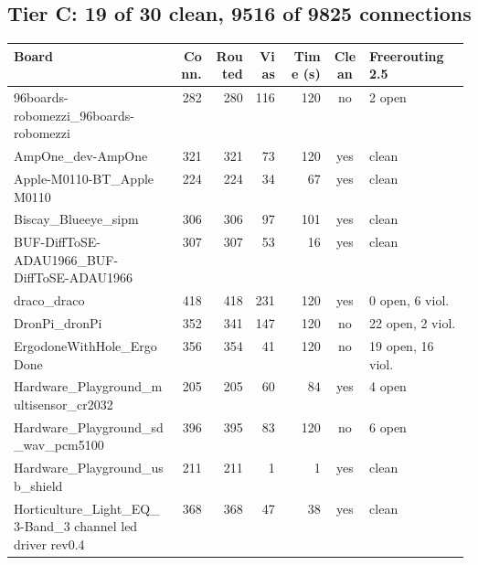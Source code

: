\subsection*{Tier C: 19 of 30 clean, 9516 of 9825 connections}
\begin{longtable}{@{}p{0.36\linewidth}rrrrcp{0.22\linewidth}@{}}
\toprule Board & Conn. & Routed & Vias & Time (s) & Clean & Freerouting 2.5 \\ \midrule \endhead
96boards-\allowbreak{}robomezzi\_\allowbreak{}96boards-\allowbreak{}robomezzi & 282 & 280 & 116 & 120 & \textcolor{frorange}{no} & {\footnotesize 2 open} \\
AmpOne\_\allowbreak{}dev-\allowbreak{}AmpOne & 321 & 321 & 73 & 120 & \textcolor{fraqua}{yes} & {\footnotesize clean} \\
Apple-\allowbreak{}M0110-\allowbreak{}BT\_\allowbreak{}Apple M0110 & 224 & 224 & 34 & 67 & \textcolor{fraqua}{yes} & {\footnotesize clean} \\
Biscay\_\allowbreak{}Blueeye\_\allowbreak{}sipm & 306 & 306 & 97 & 101 & \textcolor{fraqua}{yes} & {\footnotesize clean} \\
BUF-\allowbreak{}DiffToSE-\allowbreak{}ADAU1966\_\allowbreak{}BUF-\allowbreak{}DiffToSE-\allowbreak{}ADAU1966 & 307 & 307 & 53 & 16 & \textcolor{fraqua}{yes} & {\footnotesize clean} \\
draco\_\allowbreak{}draco & 418 & 418 & 231 & 120 & \textcolor{fraqua}{yes} & {\footnotesize 0 open, 6 viol.} \\
DronPi\_\allowbreak{}dronPi & 352 & 341 & 147 & 120 & \textcolor{frorange}{no} & {\footnotesize 22 open, 2 viol.} \\
ErgodoneWithHole\_\allowbreak{}ErgoDone & 356 & 354 & 41 & 120 & \textcolor{frorange}{no} & {\footnotesize 19 open, 16 viol.} \\
Hardware\_\allowbreak{}Playground\_\allowbreak{}multisensor\_\allowbreak{}cr2032 & 205 & 205 & 60 & 84 & \textcolor{fraqua}{yes} & {\footnotesize 4 open} \\
Hardware\_\allowbreak{}Playground\_\allowbreak{}sd\_\allowbreak{}wav\_\allowbreak{}pcm5100 & 396 & 395 & 83 & 120 & \textcolor{frorange}{no} & {\footnotesize 6 open} \\
Hardware\_\allowbreak{}Playground\_\allowbreak{}usb\_\allowbreak{}shield & 211 & 211 & 1 & 1 & \textcolor{fraqua}{yes} & {\footnotesize clean} \\
Horticulture\_\allowbreak{}Light\_\allowbreak{}EQ\_\allowbreak{}3-\allowbreak{}Band\_\allowbreak{}3 channel led driver rev0.4 & 368 & 368 & 47 & 38 & \textcolor{fraqua}{yes} & {\footnotesize clean} \\

\end{longtable}
